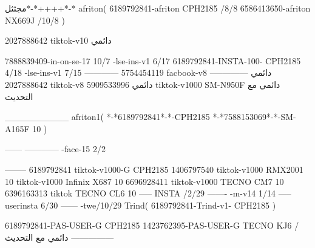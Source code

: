 مجثثل*-*++++*-*
afriton(
6189792841-afriton CPH2185  /8/8
6586413650-afriton NX669J  /10/8
)

2027888642 tiktok-v10
دائمي

7888839409-in-on-se-17 10/7
-lse-ins-v1 6/17
6189792841-INSTA-100- CPH2185 4/18
-lse-ins-v1 7/15
------------
5754454119 facbook-v8
دائمي
--------------
2027888642 tiktok-v8
دائمي
5909533996 tiktok-v1000  SM-N950F
دائمي مع التحديث

__________
afriton1(
*-*6189792841*-*-CPH2185
*-*7588153069*-*-SM-A165F 10
)


------
------------
-face-15 2/2

--------
6189792841 tiktok-v1000-G CPH2185 
1406797540 tiktok-v1000  RMX2001 10 tiktok-v1000  Infinix X687 10
6696928411 tiktok-v1000  TECNO CM7 10
6396163313 tiktok   TECNO CL6 10
-----
 INSTA /2/29
-------
-m-v14 1/14
-----
userinsta 6/30
------
-twe/10/29
Trind(
6189792841-Trind-v1- CPH2185 
)


6189792841-PAS-USER-G CPH2185 
1423762395-PAS-USER-G TECNO KJ6  /دائمي مع التحديث
    ---------------
